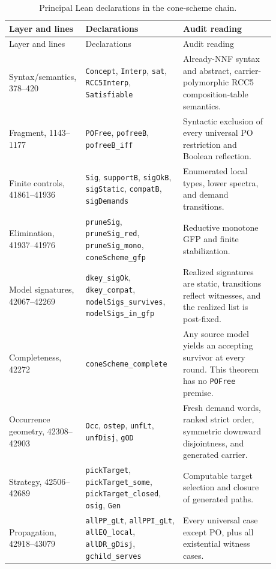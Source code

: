 \documentclass[11pt]{article}
\newcommand{\code}[1]{\texttt{#1}}
\begin{document}
\begin{longtable}{>{\raggedright\arraybackslash}p{0.18\linewidth}
                  >{\raggedright\arraybackslash}p{0.36\linewidth}
                  >{\raggedright\arraybackslash}p{0.34\linewidth}}
\caption{Principal Lean declarations in the cone-scheme chain.}\label{tab:chain}\\
\toprule
Layer and lines & Declarations & Audit reading \\
\midrule
\endfirsthead
\toprule
Layer and lines & Declarations & Audit reading \\
\midrule
\endhead
Syntax/semantics, 378--420 & \code{Concept}, \code{Interp}, \code{sat},
\code{RCC5Interp}, \code{Satisfiable} & Already-NNF syntax and abstract,
carrier-polymorphic RCC5 composition-table semantics. \\
Fragment, 1143--1177 & \code{POFree}, \code{pofreeB}, \code{pofreeB\_iff} &
Syntactic exclusion of every universal PO restriction and Boolean reflection. \\
Finite controls, 41861--41936 & \code{Sig}, \code{supportB}, \code{sigOkB},
\code{sigStatic}, \code{compatB}, \code{sigDemands} & Enumerated local types,
lower spectra, and demand transitions. \\
Elimination, 41937--41976 & \code{pruneSig}, \code{pruneSig\_red},
\code{pruneSig\_mono}, \code{coneScheme\_gfp} & Reductive monotone GFP and finite
stabilization. \\
Model signatures, 42067--42269 & \code{dkey\_sigOk}, \code{dkey\_compat},
\code{modelSigs\_survives}, \code{modelSigs\_in\_gfp} & Realized signatures are
static, transitions reflect witnesses, and the realized list is post-fixed. \\
Completeness, 42272 & \code{coneScheme\_complete} & Any source model yields an
accepting survivor at every round. This theorem has no \code{POFree} premise. \\
Occurrence geometry, 42308--42903 & \code{Occ}, \code{ostep}, \code{unfLt},
\code{unfDisj}, \code{gOD} & Fresh demand words, ranked strict order, symmetric
downward disjointness, and generated carrier. \\
Strategy, 42506--42689 & \code{pickTarget}, \code{pickTarget\_some},
\code{pickTarget\_closed}, \code{osig}, \code{Gen} & Computable target selection and
closure of generated paths. \\
Propagation, 42918--43079 & \code{allPP\_gLt}, \code{allPPI\_gLt},
\code{allEQ\_local}, \code{allDR\_gDisj}, \code{gchild\_serves} & Every universal
case except PO, plus all existential witness cases. \\

\end{longtable}
\end{document}
